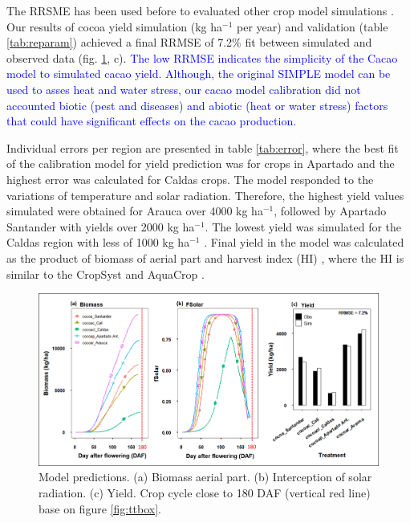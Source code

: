 \documentclass[gene,journal,article,submit,moreauthors,pdftex]{Definitions/mdpi}
\begin{document}
The RRSME has been used before to evaluated other crop model simulations \citep{Zao2019simple, Bai2020}. Our results of cocoa yield simulation (kg ha$^{-1}$ per year) and validation (table \ref{tab:reparam}) achieved a final RRMSE of 7.2\%  fit between simulated and observed data (fig. \ref{fig:m1}, c). \textcolor{blue}{ The low RRMSE  indicates the simplicity of the Cacao model to simulated cacao  yield. Although, the original SIMPLE model can be used to asses heat and water stress, our cacao model calibration  did  not accounted biotic (pest and diseases) and abiotic (heat or water stress) factors that could have significant effects on the cacao production.}

Individual errors per region are presented in table \ref{tab:error}, where the best fit of the calibration model for yield prediction  was for crops in  Apartado and the highest error was calculated for Caldas crops.  
 The model responded to the variations of temperature and solar radiation. Therefore, the highest  yield values simulated were obtained for Arauca over 4000 kg ha$^{-1}$, followed by Apartado Santander with yields over 2000 kg ha$^{-1}$.  The lowest yield was simulated for the Caldas region with less of 1000 kg ha$^{-1}$ . Final yield in the model was calculated as the product of biomass of aerial part and harvest index (HI) \citep{Zao2019simple, Amir1991}, where the HI is similar to the CropSyst \citep{STOCKLE2003} and AquaCrop \cite{Steduto2009}. 

\begin{figure}[h!]
	\centering
	\includegraphics[scale=0.4]{images/outmodel.png}
	\caption{\footnotesize {Model predictions. (a) Biomass aerial part. (b) Interception of solar radiation. (c) Yield. Crop cycle close to 180 DAF (vertical red line) base on figure  \ref{fig:ttbox}.  \\ }} 
	\label{fig:m1}
\end{figure}
 
\end{document}
